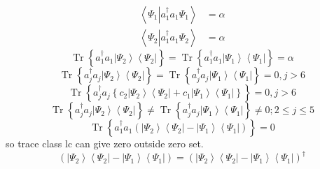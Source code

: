 \documentclass[aps,preprint]{revtex4}%
\begin{document}
\begin{align}
\left\langle \Psi_{1}\left\vert a_{1}^{\dagger}a_{1}\Psi_{1}\right.
\right\rangle  & =\alpha\\
\left\langle \Psi_{2}\left\vert a_{1}^{\dagger}a_{1}\Psi_{2}\right.
\right\rangle  & =\alpha
\end{align}%
\begin{equation}
\operatorname*{Tr}\left\{  a_{1}^{\dagger}a_{1}\left\vert \Psi_{2}%
\right\rangle \left\langle \Psi_{2}\right\vert \right\}  =\operatorname*{Tr}%
\left\{  a_{1}^{\dagger}a_{1}\left\vert \Psi_{1}\right\rangle \left\langle
\Psi_{1}\right\vert \right\}  =\alpha
\end{equation}%
\begin{equation}
\operatorname*{Tr}\left\{  a_{j}^{\dagger}a_{j}\left\vert \Psi_{2}%
\right\rangle \left\langle \Psi_{2}\right\vert \right\}  =\operatorname*{Tr}%
\left\{  a_{j}^{\dagger}a_{j}\left\vert \Psi_{1}\right\rangle \left\langle
\Psi_{1}\right\vert \right\}  =0,j>6
\end{equation}%
\begin{equation}
\operatorname*{Tr}\left\{  a_{j}^{\dagger}a_{j}\left\{  c_{2}\left\vert
\Psi_{2}\right\rangle \left\langle \Psi_{2}\right\vert +c_{1}\left\vert
\Psi_{1}\right\rangle \left\langle \Psi_{1}\right\vert \right\}  \right\}
=0,j>6
\end{equation}%
\begin{equation}
\operatorname*{Tr}\left\{  a_{j}^{\dagger}a_{j}\left\vert \Psi_{2}%
\right\rangle \left\langle \Psi_{2}\right\vert \right\}  \neq
\operatorname*{Tr}\left\{  a_{j}^{\dagger}a_{j}\left\vert \Psi_{1}%
\right\rangle \left\langle \Psi_{1}\right\vert \right\}  \neq0;2\leq j\leq5
\end{equation}%
\begin{equation}
\operatorname*{Tr}\left\{  a_{1}^{\dagger}a_{1}\left(  \left\vert \Psi
_{2}\right\rangle \left\langle \Psi_{2}\right\vert -\left\vert \Psi
_{1}\right\rangle \left\langle \Psi_{1}\right\vert \right)  \right\}  =0
\end{equation}
so trace class lc can give zero outside zero set.
\begin{equation}
\left(  \left\vert \Psi_{2}\right\rangle \left\langle \Psi_{2}\right\vert
-\left\vert \Psi_{1}\right\rangle \left\langle \Psi_{1}\right\vert \right)
=\left(  \left\vert \Psi_{2}\right\rangle \left\langle \Psi_{2}\right\vert
-\left\vert \Psi_{1}\right\rangle \left\langle \Psi_{1}\right\vert \right)
^{\dagger}%
\end{equation}%
\end{document}
